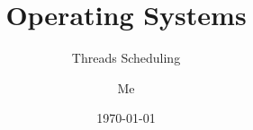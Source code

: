 \documentclass[12pt]{beamer}
\title{Operating Systems}
\subtitle{Threads Scheduling}
\author{Me}
\date{\today}
\begin{document}
  \begin{frame}
    \titlepage
  \end{frame}

  
  
  
  
  

%    
\end{document}
